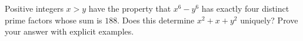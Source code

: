Positive integers $x>y$ have the property that $x^6-y^6$ has exactly four distinct prime factors whose sum is $188$. Does this determine $x^2+x+y^2$ uniquely? Prove your answer with explicit examples.
